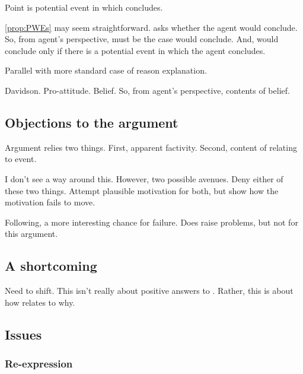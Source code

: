 \newpage

\begin{note}
  \color{blue}
  Point is potential event in which concludes.

  \autoref{prop:PWEs} may seem straightforward.
  \qzS{} asks whether the agent would conclude.
  So, from agent's perspective, must be the case would conclude.
  And, would conclude only if there is a potential event in which the agent concludes.

  Parallel with more standard case of reason explanation.

  Davidson.
  Pro-attitude.
  Belief.
  So, from agent's perspective, contents of belief.
\end{note}

\subsection{Objections to the argument}
\label{sec:objections-argument}

\begin{note}
  Argument relies two things.
  First, apparent factivity.
  Second, content of \qzS{} relating to event.

  I don't see a way around this.
  However, two possible avenues.
  Deny either of these two things.
  Attempt plausible motivation for both, but show how the motivation fails to move.

  Following, a more interesting chance for failure.
  Does raise problems, but not for this argument.
\end{note}

\subsection{A shortcoming}
\label{sec:shortcoming}

\begin{note}
  \color{red}
  Need to shift.
  This isn't really about positive answers to \qzS{}.
  Rather, this is about how \qzS{} relates to why.
\end{note}


\subsection{Issues}
\label{sec:issues}

\subsubsection{Re-expression}
\label{sec:answers-which-are}

